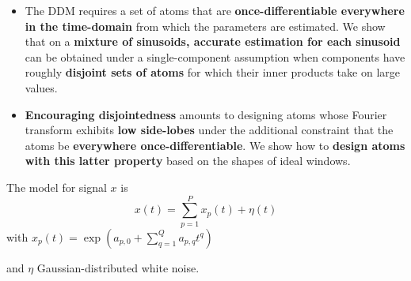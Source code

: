 \documentclass[plainsections,landscape]{sciposter}
\newcommand{\myinnercolsep}{1cm}
\newcommand{\mytcbtitlewrap}[1]{{\parbox[bottom][1.5cm][c]{\linewidth}{#1}}}
\begin{document}
\begin{multicols}{3}
\begin{tcolorbox}[title=\mytcbtitlewrap{Introduction}]
\begin{multicols}{2}
\begin{itemize}
        \item{The DDM requires a set of atoms that are \textbf{once-differentiable everywhere in
            the time-domain} from which the parameters are estimated. We
    show that on a \textbf{mixture of sinusoids, accurate estimation for each
            sinusoid}
    can be obtained under a single-component
            assumption when components have roughly \textbf{disjoint sets of atoms} for which their
inner products take on large values.}

\item{\textbf{Encouraging disjointedness} amounts to designing atoms whose Fourier
    transform exhibits \textbf{low side-lobes} under the additional constraint that
            the atoms be \textbf{everywhere once-differentiable}. We show how to \textbf{design atoms
            with this latter property} based on the shapes of ideal windows.}
    \end{itemize}
\end{multicols}
\end{tcolorbox}

\addtocounter{footnote}{1}
\addtocounter{footnote}{1}%

\begin{tcolorbox}[title=\mytcbtitlewrap{Estimating the
    \lowercase{$a_{p,q}$} of $P$ components}]
\setlength{\columnsep}{\myinnercolsep}
\begin{multicols}{2}
The model for signal $x$ is
%
\begin{equation}
    \label{eq:polyphaseexpmix}
    x(t) = \sum_{p=1}^{P} x_{p}(t) + \eta(t)
\end{equation}
%
with $ x_{p}(t) = \exp(a_{p,0} + \sum_{q=1}^{Q} a_{p,q} t^q) $

and $\eta$ Gaussian-distributed white noise. 


\end{multicols}
\end{tcolorbox}
\end{multicols}
\end{document}

